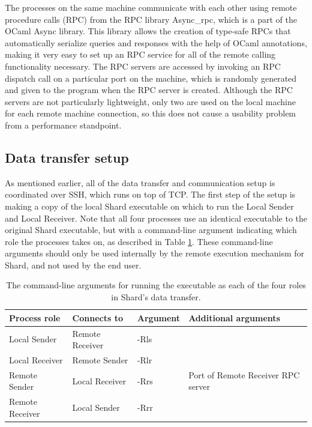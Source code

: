 \documentclass[twoside]{report}
\begin{document}
The processes on the same machine communicate with each other using remote procedure calls (RPC) from the RPC library Async\_rpc, which is a part of the OCaml Async library.
This library allows the creation of type-safe RPCs that automatically serialize queries and responses with the help of OCaml annotations, making it very easy to set up an RPC service for all of the remote calling functionality necessary.
The RPC servers are accessed by invoking an RPC dispatch call on a particular port on the machine, which is randomly generated and given to the program when the RPC server is created.
Although the RPC servers are not particularly lightweight, only two are used on the local machine for each remote machine connection, so this does not cause a usability problem from a performance standpoint.

\subsection{Data transfer setup}

As mentioned earlier, all of the data transfer and communication setup is coordinated over SSH, which runs on top of TCP.
The first step of the setup is making a copy of the local Shard executable on which to run the Local Sender and Local Receiver.
Note that all four processes use an identical executable to the original Shard executable, but with a command-line argument indicating which role the processes takes on, as described in Table \ref{fig:process_role_args}.
These command-line arguments should only be used internally by the remote execution mechanism for Shard, and not used by the end user.

\begin{table}[h]
  \begin{center}
    \begin{tabular}{|l|l|l|l|}
      \hline
      Process role    & Connects to     & Argument & Additional arguments               \\ \hline
      Local Sender    & Remote Receiver & -Rls     &                                    \\ \hline
      Local Receiver  & Remote Sender   & -Rlr     &                                    \\ \hline
      Remote Sender   & Local Receiver  & -Rrs     & Port of Remote Receiver RPC server \\ \hline
      Remote Receiver & Local Sender    & -Rrr     &                                    \\ \hline
    \end{tabular}
    \caption{The command-line arguments for running the executable as each of the four roles in Shard's data transfer.}
    \label{fig:process_role_args}
  \end{center}
\end{table}
\end{document}
